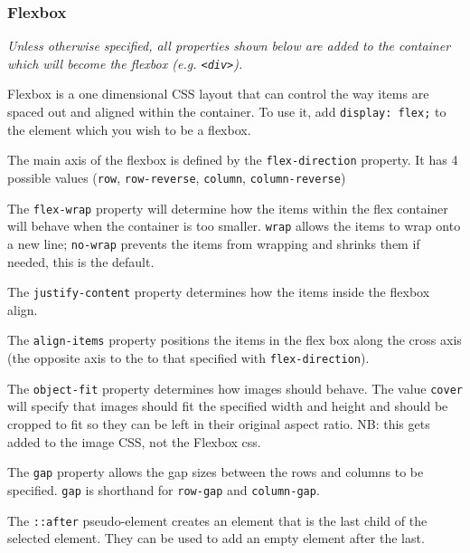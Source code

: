 \subsubsection{Flexbox}
\textit{Unless otherwise specified, all properties shown below are added to the container which will become the flexbox (e.g. \texttt{<div>}).}

Flexbox is a one dimensional CSS layout that can control the way items are spaced out and aligned within the container. To use it, add \texttt{display: flex;} to the element which you wish to be a flexbox.

The main axis of the flexbox is defined by the \texttt{flex-direction} property. It has 4 possible values (\texttt{row}, \texttt{row-reverse}, \texttt{column}, \texttt{column-reverse})

The \texttt{flex-wrap} property will determine how the items within the flex container will behave when the container is too smaller. \texttt{wrap} allows the items to wrap onto a new line; \texttt{no-wrap} prevents the items from wrapping and shrinks them if needed, this is the default.

The \texttt{justify-content} property determines how the items inside the flexbox align.

The \texttt{align-items} property positions the items in the flex box along the cross axis (the opposite axis to the to that specified with \texttt{flex-direction}). 

The \texttt{object-fit} property determines how images should behave. The value \texttt{cover} will specify that images should fit the specified width and height and should be cropped to fit so they can be left in their original aspect ratio. NB: this gets added to the image CSS, not the Flexbox css.

The \texttt{gap} property allows the gap sizes between the rows and columns to be specified. \texttt{gap} is shorthand for \texttt{row-gap} and \texttt{column-gap}. 

The \texttt{::after} pseudo-element creates an element that is the last child of the selected element. They can be used to add an empty element after the last.

